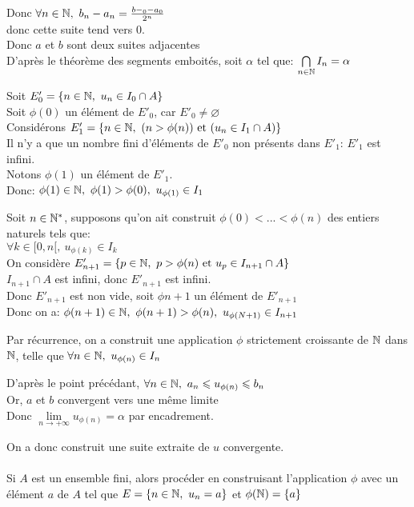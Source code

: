 \documentclass[12pt,twoside,a4paper]{article}
\begin{document}
\begin{preuve}
\begin{liste}
					Donc $\forall n\in\N,\ b_n-a_n=\frac{b-_0-a_0}{2^n}$\\
					donc cette suite tend vers $0$.\\
					Donc $a$ et $b$ sont deux suites adjacentes\\
					D'apr\`es le th\'eor\`eme des segments emboit\'es, soit $\alpha$ tel que: $\bigcap\limits_{n\in\mathbb{N}}I_n={\alpha}$
				\item Soit $E'_0=\{n\in\mathbb{N},\ u_n\in I_0\cap A\}$\\
					Soit $\phi(0)$ un \'el\'ement de $E'_0$, car $E'_0\neq\varnothing$\\
					Consid\'erons $E'_1=\{n\in\N,\ (n>\phi(n))\et(u_n\in I_1\cap A)\}$\\
					Il n'y a que un nombre fini d'\'el\'ements de $E'_0$ non pr\'esents dans $E'_1$: $E'_1$ est infini.\\
					Notons $\phi(1)$ un \'el\'ement de $E'_1$.\\
					Donc: $\phi(1)\in\N,\ \phi(1)>\phi(0),\ u_{\phi(1)}\in I_1$
				\item Soit $n\in\mathbb{N}^*$, supposons qu'on ait construit $\phi(0)<...<\phi(n)$ des entiers naturels tels que:\\
					$\forall k\in\lbrack0,n\lbrack,\ u_{\phi(k)}\in I_k$\\
					On consid\`ere $E'_{n+1}=\{p\in\N,\ p>\phi(n)\et u_p\in I_{n+1}\cap A \}$\\
					$I_{n+1}\cap A$ est infini, donc $E'_{n+1}$ est infini.\\
					Donc $E'_{n+1}$ est non vide, soit $\phi{n+1}$ un \'el\'ement de $E'_{n+1}$\\
					Donc on a: $\phi(n+1)\in\N,\ \phi(n+1)>\phi(n),\ u_{\phi(N+1)}\in I_{n+1}$
				\item Par r\'ecurrence, on a construit une application $\phi$ strictement croissante de $\mathbb{N}$ dans $\mathbb{N}$, telle que $\forall n\in\mathbb{N},\ u_{\phi(n)}\in I_n$
				\item D'apr\`es le point pr\'ec\'edant, $\forall n\in\mathbb{N},\ a_n\leqslant u_{\phi(n)}\leqslant b_n$\\
					Or, $a$ et $b$ convergent vers une m\^eme limite\\
					Donc $\lim\limits_{n\rightarrow+\infty}u_{\phi(n)}=\alpha$ par encadrement.
			\end{liste} 
			On a donc construit une suite extraite de $u$ convergente.\\
			\\
			Si $A$ est un ensemble fini, alors proc\'eder en construisant l'application $\phi$ avec un \'el\'ement $a$ de $A$ tel que $E=\{n\in\mathbb{N},\ u_n=a\}$ et $\phi(\mathbb{N})=\{a\}$
		\end{preuve}
\end{document}
